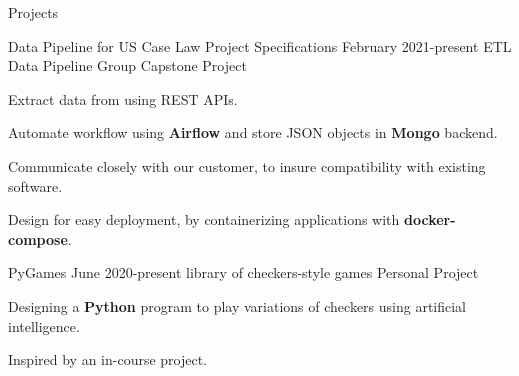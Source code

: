 \documentclass{resume} %
\begin{document}
\begin{Section} {Projects}
	\begin{comment}
	\begin{Project} {TeXume}
		{\URL{https://github.com/jack17davis/TeXume}
			{github.com/jack17davis/TeXume/}}
		{August 2020-present}
		{LaTeX-based Resume Template}
		{Personal Project}
		\item Maintain a repository to share the \textbf{LaTeX} source code I use to generate my resume.
	\end{Project}
	\end{comment}
	
		\begin{Project} {Data Pipeline for US Case Law}
		{
			{Project Specifications}}
		{February 2021-present}
		{ETL Data Pipeline}
		{Group Capstone Project}
		\item Extract data from  using REST APIs.
		\item Automate workflow using \textbf{Airflow} and store JSON objects in \textbf{Mongo} backend.
		\item Communicate closely with our customer,  to insure compatibility with existing software.
		\item Design for easy deployment, by containerizing applications with \textbf{docker-compose}.
	\end{Project}

	\begin{Project} {PyGames}
		{}
		{June 2020-present}
		{library of checkers-style games}
		{Personal Project}
		\item Designing a \textbf{Python} program to play variations of checkers using artificial intelligence.
		\item Inspired by an in-course project.
	\end{Project}


\end{Section}
\end{document}
